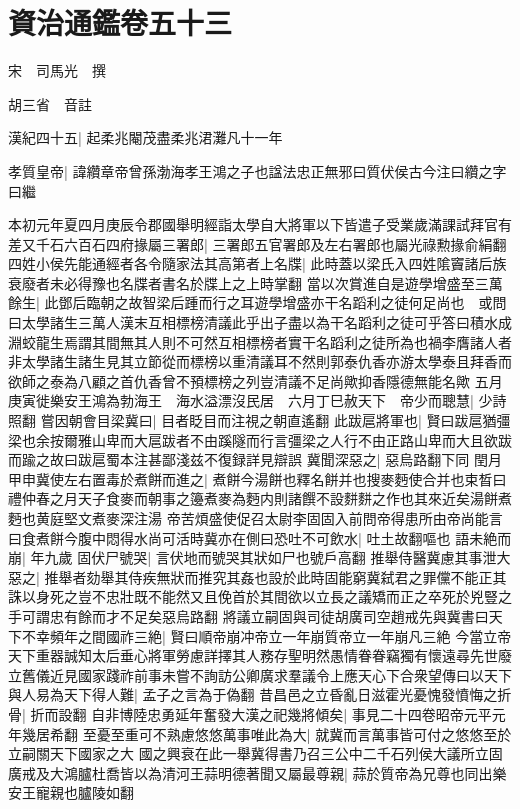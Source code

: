 \section{資治通鑑卷五十三}
宋　司馬光　撰

胡三省　音註

漢紀四十五|{
	起柔兆閹茂盡柔兆涒灘凡十一年}


孝質皇帝|{
	諱纘章帝曾孫渤海孝王鴻之子也諡法忠正無邪曰質伏侯古今注曰纘之字曰繼}


本初元年夏四月庚辰令郡國舉明經詣太學自大將軍以下皆遣子受業歲滿課試拜官有差又千石六百石四府掾屬三署郎|{
	三署郎五官署郎及左右署郎也屬光祿勲掾俞絹翻}
四姓小侯先能通經者各令隨家法其高第者上名牒|{
	此時蓋以梁氏入四姓隂竇諸后族衰廢者未必得豫也名牒者書名於牒上之上時掌翻}
當以次賞進自是遊學增盛至三萬餘生|{
	此鄧后臨朝之故智梁后踵而行之耳遊學增盛亦干名蹈利之徒何足尚也　或問曰太學諸生三萬人漢末互相標榜清議此乎出子盡以為干名蹈利之徒可乎答曰積水成淵蛟龍生焉謂其間無其人則不可然互相標榜者實干名蹈利之徒所為也禍李膺諸人者非太學諸生諸生見其立節從而標榜以重清議耳不然則郭泰仇香亦游太學泰且拜香而欲師之泰為八顧之首仇香曾不預標榜之列豈清議不足尚歟抑香隱德無能名歟}
五月庚寅徙樂安王鴻為勃海王　海水溢漂沒民居　六月丁巳赦天下　帝少而聰慧|{
	少詩照翻}
嘗因朝會目梁冀曰|{
	目者眨目而注視之朝直遙翻}
此跋扈將軍也|{
	賢曰跋扈猶彊梁也余按爾雅山卑而大扈跋者不由蹊隧而行言彊梁之人行不由正路山卑而大且欲跋而踰之故曰跋扈蜀本注甚鄙淺兹不復録詳見辯誤}
冀聞深惡之|{
	惡烏路翻下同}
閏月甲申冀使左右置毒於煮餅而進之|{
	煮餅今湯餅也釋名餅并也搜麥麪使合并也束晳曰禮仲春之月天子食麥而朝事之籩煮麥為麪内則諸饌不設䴵䴵之作也其來近矣湯餅煮麪也黄庭堅文煮麥深注湯}
帝苦煩盛使促召太尉李固固入前問帝得患所由帝尚能言曰食煮餅今腹中悶得水尚可活時冀亦在側曰恐吐不可飲水|{
	吐土故翻嘔也}
語未絶而崩|{
	年九歲}
固伏尸號哭|{
	言伏地而號哭其狀如尸也號戶高翻}
推舉侍醫冀慮其事泄大惡之|{
	推舉者劾舉其侍疾無狀而推究其姦也設於此時固能窮冀弑君之罪儻不能正其誅以身死之豈不忠壯既不能然又且俛首於其間欲以立長之議矯而正之卒死於兇豎之手可謂忠有餘而才不足矣惡烏路翻}
將議立嗣固與司徒胡廣司空趙戒先與冀書曰天下不幸頻年之間國祚三絶|{
	賢曰順帝崩冲帝立一年崩質帝立一年崩凡三絶}
今當立帝天下重器誠知太后垂心將軍勞慮詳擇其人務存聖明然愚情眷眷竊獨有懷遠尋先世廢立舊儀近見國家踐祚前事未嘗不詢訪公卿廣求羣議令上應天心下合衆望傳曰以天下與人易為天下得人難|{
	孟子之言為于偽翻}
昔昌邑之立昏亂日滋霍光憂愧發憤悔之折骨|{
	折而設翻}
自非博陸忠勇延年奮發大漢之祀幾將傾矣|{
	事見二十四卷昭帝元平元年幾居希翻}
至憂至重可不熟慮悠悠萬事唯此為大|{
	就冀而言萬事皆可付之悠悠至於立嗣關天下國家之大}
國之興衰在此一舉冀得書乃召三公中二千石列侯大議所立固廣戒及大鴻臚杜喬皆以為清河王蒜明德著聞又屬最尊親|{
	蒜於質帝為兄尊也同出樂安王寵親也臚陵如翻}
